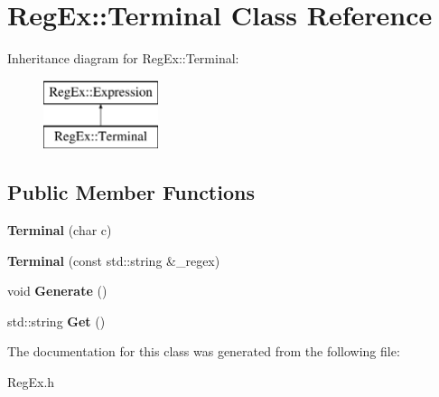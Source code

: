 \hypertarget{class_reg_ex_1_1_terminal}{}\section{Reg\+Ex\+:\+:Terminal Class Reference}
\label{class_reg_ex_1_1_terminal}
Inheritance diagram for Reg\+Ex\+:\+:Terminal\+:\begin{figure}[H]
\begin{center}
\leavevmode
\includegraphics[height=2.000000cm]{class_reg_ex_1_1_terminal}
\end{center}
\end{figure}
\subsection*{Public Member Functions}
\begin{DoxyCompactItemize}
\item 
\mbox{\label{class_reg_ex_1_1_terminal_a006d1b7c4c76d5c4780242d374ab7231}} 
{\bfseries Terminal} (char c)
\item 
\mbox{\label{class_reg_ex_1_1_terminal_ad028ff321058247c2a8dc221fea5ccd6}} 
{\bfseries Terminal} (const std\+::string \&\+\_\+regex)
\item 
\mbox{\label{class_reg_ex_1_1_terminal_aa2fe782395367b60378cde6fa8ce1ffa}} 
void {\bfseries Generate} ()
\item 
\mbox{\label{class_reg_ex_1_1_terminal_ac29198abae509962e6f41203a1bb8caf}} 
std\+::string {\bfseries Get} ()
\end{DoxyCompactItemize}


The documentation for this class was generated from the following file\+:\begin{DoxyCompactItemize}
\item 
Reg\+Ex.\+h\end{DoxyCompactItemize}
